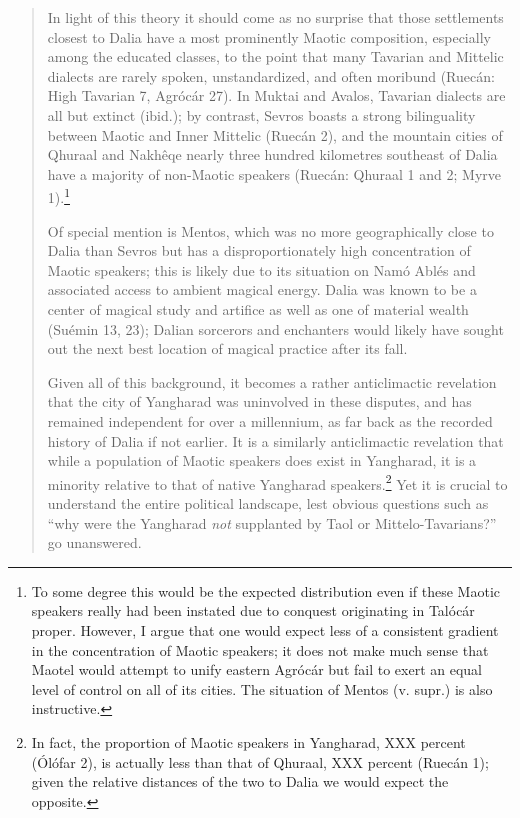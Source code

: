 \documentclass{article}
\begin{document}
\begin{quotation}
In light of this theory it should come as no surprise that those settlements closest to Dalia have a most prominently Maotic composition, especially among the educated classes, to the point that many Tavarian and Mittelic dialects are rarely spoken, unstandardized, and often moribund (Ruecán: High Tavarian 7, Agrócár 27). In Muktai and Avalos, Tavarian dialects are all but extinct (ibid.); by contrast, Sevros boasts a strong bilinguality between Maotic and Inner Mittelic (Ruecán 2), and the mountain cities of Qhuraal and Nakhêqe nearly three hundred kilometres southeast of Dalia have a majority of non-Maotic speakers (Ruecán: Qhuraal 1 and 2; Myrve 1).\footnote{To some degree this would be the expected distribution even if these Maotic speakers really had been instated due to conquest originating in Talócár proper. However, I argue that one would expect less of a consistent gradient in the concentration of Maotic speakers; it does not make much sense that Maotel would attempt to unify eastern Agrócár but fail to exert an equal level of control on all of its cities. The situation of Mentos (v. supr.) is also instructive.}

Of special mention is Mentos, which was no more geographically close to Dalia than Sevros but has a disproportionately high concentration of Maotic speakers; this is likely due to its situation on Namó Ablés and associated access to ambient magical energy. Dalia was known to be a center of magical study and artifice as well as one of material wealth (Suémin 13, 23); Dalian sorcerors and enchanters would likely have sought out the next best location of magical practice after its fall.


Given all of this background, it becomes a rather anticlimactic revelation that the city of Yangharad was uninvolved in these disputes, and has remained independent for over a millennium, as far back as the recorded history of Dalia if not earlier. It is a similarly anticlimactic revelation that while a population of Maotic speakers does exist in Yangharad, it is a minority relative to that of native Yangharad speakers.\footnote{In fact, the proportion of Maotic speakers in Yangharad, XXX percent (Ólófar 2), is actually less than that of Qhuraal, XXX percent (Ruecán 1); given the relative distances of the two to Dalia we would expect the opposite.} Yet it is crucial to understand the entire political landscape, lest obvious questions such as ``why were the Yangharad \emph{not} supplanted by Taol or Mittelo-Tavarians?'' go unanswered.



\end{quotation}
\end{document}
